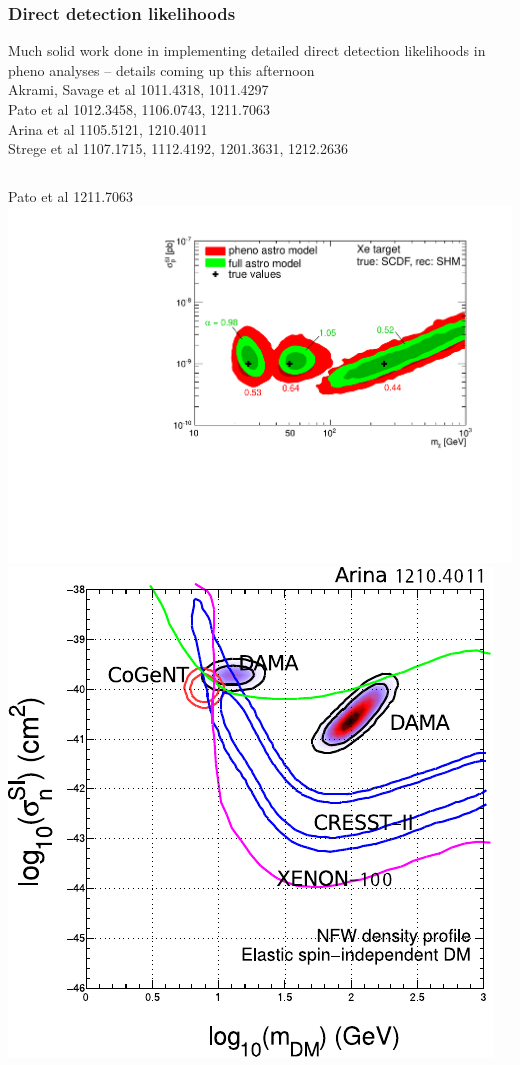 \documentclass[xcolor=dvipsnames]{beamer}
\begin{document}
\begin{frame}

\frametitle{Direct detection likelihoods}

Much solid work done in implementing detailed direct detection likelihoods in pheno analyses -- \alert{details coming up this afternoon}
\\\vspace{3mm}
\tiny{Akrami, Savage et al 1011.4318, 1011.4297\\
Pato et al 1012.3458, 1106.0743, 1211.7063\\
Arina et al 1105.5121, 1210.4011\\
Strege et al 1107.1715, 1112.4192, 1201.3631, 1212.2636}

\begin{columns}
    \tiny Pato et al 1211.7063
    \includegraphics[width=\linewidth]{fig4a_phenofull}
    \includegraphics[width=0.8\linewidth]{arina_ex}
\end{columns}

\end{frame}
\end{document}

